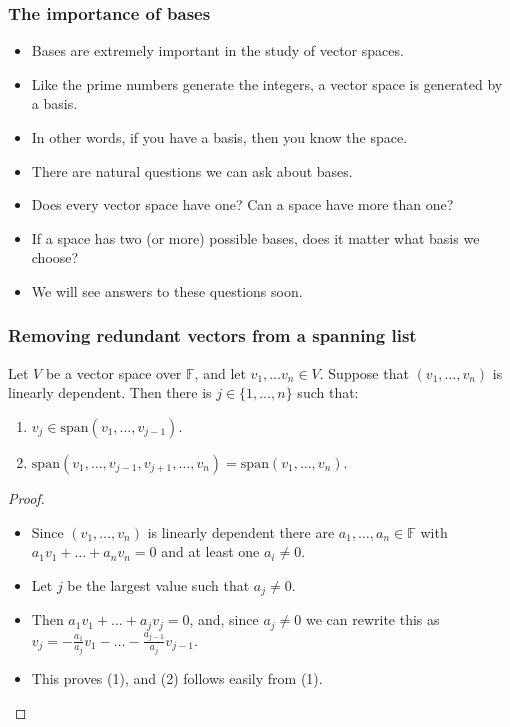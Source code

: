 \documentclass[handout]{beamer}
\newcommand{\bF}{\mathbb{F}}
\newcommand{\spa}{\mathrm{span}}
\begin{document}
\begin{frame}
\frametitle{The importance of bases}
\begin{itemize}
\item Bases are extremely important in the study of vector spaces. 
\vspace{0.3cm}
\item Like the prime numbers generate the integers, a vector space is generated by a basis. 
\vspace{0.3cm}
\item In other words, if you have a basis, then you know the space. 
\vspace{0.3cm}
\item There are natural questions we can ask about bases. 
\vspace{0.3cm}
\item Does every vector space have one? Can a space have more than one? 
\vspace{0.3cm}
\item If a space has two (or more) possible bases, does it matter what basis we choose? 
\vspace{0.3cm}
\item We will see answers to these questions soon.
\end{itemize}
\end{frame}

\begin{frame}
\frametitle{Removing redundant vectors from a spanning list}
\begin{lemma}\label{L:LA2tech}
Let $V$ be a vector space over $\bF$, and let $v_1,\ldots v_n\in V$. Suppose that $(v_1,\ldots,v_n)$ is linearly dependent. Then there is $j\in\{1,\ldots,n\}$ such that:
\begin{enumerate}
\item $v_j \in \spa(v_1,\ldots,v_{j-1})$.
\item $\spa(v_1,\ldots , v_{j-1}, v_{j+1},\ldots, v_n) = \spa(v_1,\ldots,v_n)$.
\end{enumerate} 
\end{lemma}
\begin{proof}
\begin{itemize}
\item Since $(v_1,\ldots,v_n)$ is linearly dependent there are $a_1,\ldots,a_n\in \bF$ with $a_1v_1+\ldots + a_nv_n = 0$ and at least one $a_i\neq 0$. 
\item Let $j$ be the largest value such that $a_j\neq 0$. 
\item Then $a_1v_1 + \ldots +a_j v_j = 0$, and, since $a_j\neq 0$ we can rewrite this as $v_j = -\frac{a_1}{a_j}v_1-\ldots -\frac{a_{j-1}}{a_j}v_{j-1}$. 
\item This proves (1), and (2) follows easily from (1). 
\end{itemize}
\end{proof}
\end{frame}
\end{document}
